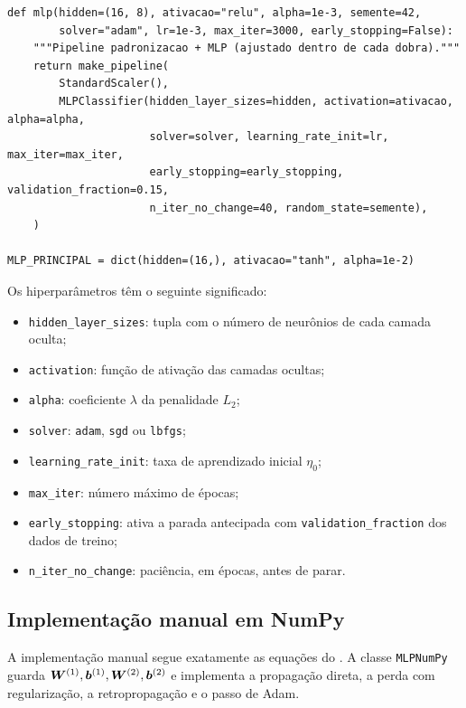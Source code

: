 \begin{lstlisting}[caption={Definição do modelo principal (extrato de \texttt{mlp\_iris.py}).},label={lst:pipeline}]
def mlp(hidden=(16, 8), ativacao="relu", alpha=1e-3, semente=42,
        solver="adam", lr=1e-3, max_iter=3000, early_stopping=False):
    """Pipeline padronizacao + MLP (ajustado dentro de cada dobra)."""
    return make_pipeline(
        StandardScaler(),
        MLPClassifier(hidden_layer_sizes=hidden, activation=ativacao, alpha=alpha,
                      solver=solver, learning_rate_init=lr, max_iter=max_iter,
                      early_stopping=early_stopping, validation_fraction=0.15,
                      n_iter_no_change=40, random_state=semente),
    )

MLP_PRINCIPAL = dict(hidden=(16,), ativacao="tanh", alpha=1e-2)
\end{lstlisting}

Os hiperparâmetros têm o seguinte significado:

\begin{itemize}
	\item \texttt{hidden\_layer\_sizes}: tupla com o número de neurônios de cada camada oculta;
	\item \texttt{activation}: função de ativação das camadas ocultas;
	\item \texttt{alpha}: coeficiente $\lambda$ da penalidade $L_2$;
	\item \texttt{solver}: \texttt{adam}, \texttt{sgd} ou \texttt{lbfgs};
	\item \texttt{learning\_rate\_init}: taxa de aprendizado inicial $\eta_0$;
	\item \texttt{max\_iter}: número máximo de épocas;
	\item \texttt{early\_stopping}: ativa a parada antecipada com \texttt{validation\_fraction}
	      dos dados de treino;
	\item \texttt{n\_iter\_no\_change}: paciência, em épocas, antes de parar.
\end{itemize}

\subsection{Implementação manual em NumPy}

A implementação manual segue exatamente as equações do . A classe
\texttt{MLPNumPy} guarda $\bm{W}^{(1)},\bm{b}^{(1)},\bm{W}^{(2)},\bm{b}^{(2)}$ e implementa a propagação
direta, a perda com regularização, a retropropagação e o passo de Adam.

